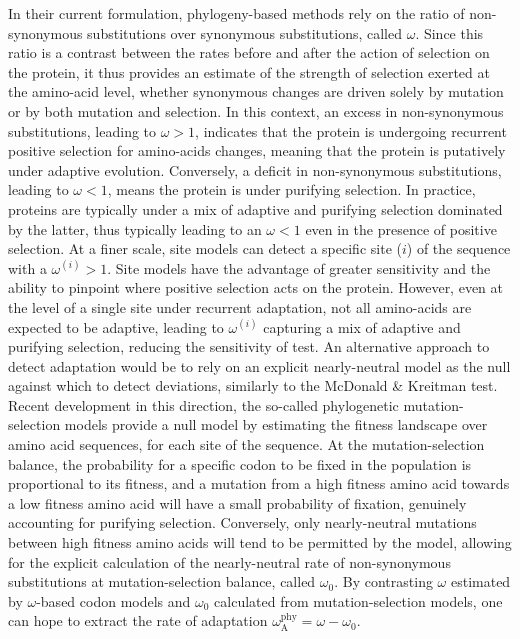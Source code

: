\documentclass[9pt,twocolumn,twoside,lineno]{pnas-new}
\newcommand{\rateApop}{\omega_{\mathrm{A}}}
\newcommand{\rateAphy}{\rateApop^{\mathrm{phy}}}
\begin{document}
In their current formulation, phylogeny-based methods rely on the ratio of non-synonymous substitutions over synonymous substitutions, called $\omega$\cite{muse_likelihood_1994,goldman_codonbased_1994}.
Since this ratio is a contrast between the rates before and after the action of selection on the protein, it thus provides an estimate of the strength of selection exerted at the amino-acid level, whether synonymous changes are driven solely by mutation or by both mutation and selection\cite{yang_mutationselection_2008}.
In this context, an excess in non-synonymous substitutions, leading to $\omega>1$, indicates that the protein is undergoing recurrent positive selection for amino-acids changes, meaning that the protein is putatively under adaptive evolution.
Conversely, a deficit in non-synonymous substitutions, leading to $\omega<1$, means the protein is under purifying selection.
In practice, proteins are typically under a mix of adaptive and purifying selection dominated by the latter, thus typically leading to an $\omega<1$ even in the presence of positive selection.
At a finer scale, site models can detect a specific site ($i$) of the sequence with a $\omega^{(i)}>1$\cite{yang_codonsubstitution_2000, kosiol_patterns_2008}.
Site models have the advantage of greater sensitivity and the ability to pinpoint where positive selection acts on the protein.
However, even at the level of a single site under recurrent adaptation, not all amino-acids are expected to be adaptive, leading to $\omega^{(i)}$ capturing a mix of adaptive and purifying selection, reducing the sensitivity of test.
An alternative approach to detect adaptation would be to rely on an explicit nearly-neutral model as the null against which to detect deviations, similarly to the McDonald \& Kreitman test.
Recent development in this direction, the so-called phylogenetic mutation-selection models provide a null model by estimating the fitness landscape over amino acid sequences, for each site of the sequence\cite{yang_mutationselection_2008, halpern_evolutionary_1998, rodrigue_mechanistic_2010}.
At the mutation-selection balance, the probability for a specific codon to be fixed in the population is proportional to its fitness, and a mutation from a high fitness amino acid towards a low fitness amino acid will have a small probability of fixation, genuinely accounting for purifying selection.
Conversely, only nearly-neutral mutations between high fitness amino acids will tend to be permitted by the model, allowing for the explicit calculation of the nearly-neutral rate of non-synonymous substitutions at mutation-selection balance, called $\omega_{0}$\cite{spielman_relationship_2015, rodrigue_detecting_2017}.
By contrasting $\omega$ estimated by $\omega$-based codon models and $\omega_{0}$ calculated from mutation-selection models, one can hope to extract the rate of adaptation $\rateAphy = \omega - \omega_{0}$.
\end{document}
